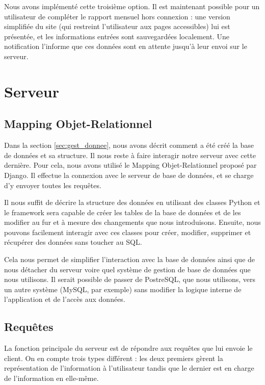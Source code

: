 \documentclass{EPL-master-thesis-covers-FR}
\begin{document}
				Nous avons implémenté cette troisième option. Il est maintenant possible pour un utilisateur de compléter le rapport mensuel hors connexion : une version simplifiée du site (qui restreint l'utilisateur aux pages accessibles) lui est présentée, et les informations entrées sont sauvegardées localement. Une notification l'informe que ces données sont en attente jusqu'à leur envoi sur le serveur.

		\section{Serveur}
			\label{sec:serveur}


			\subsection*{Mapping Objet-Relationnel}

				Dans la section \ref{sec:gest_donnee}, nous avons décrit comment a été créé la base de données et sa structure. Il nous reste à faire interagir notre serveur avec cette dernière. Pour cela, nous avons utilisé le Mapping Objet-Relationnel proposé par Django. Il effectue la connexion avec le serveur de base de données, et se charge d'y envoyer toutes les requêtes.

				Il nous suffit de décrire la structure des données en utilisant des classes Python et le framework sera capable de créer les tables de la base de données et de les modifier au fur et à mesure des changements que nous introduisons. Ensuite, nous pouvons facilement interagir avec ces classes pour créer, modifier, supprimer et récupérer des données sans toucher au SQL.

				Cela nous permet de simplifier l'interaction avec la base de données ainsi que de nous détacher du serveur voire quel système de gestion de base de données que nous utilisons. Il serait possible de passer de PostreSQL, que nous utilisons, vers un autre système (MySQL, par exemple) sans modifier la logique interne de l'application et de l'accès aux données.

			\subsection*{Requêtes}

				La fonction principale du serveur est de répondre aux requêtes que lui envoie le client. On en compte trois types différent : les deux premiers gèrent la représentation de l'information à l'utilisateur tandis que le dernier est en charge de l'information en elle-même.
\end{document}
